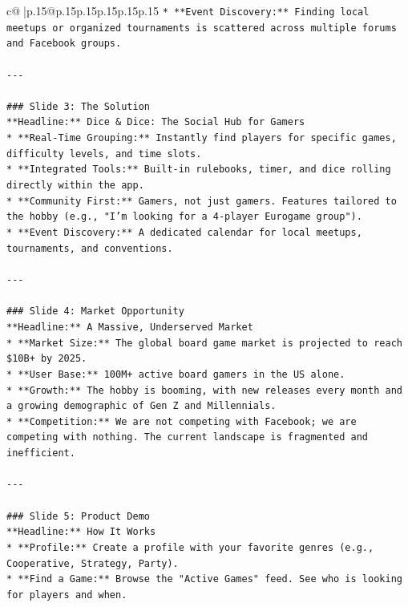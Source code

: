 \documentclass{article}
\begin{document}
{\begin{supertabular}{c@{$\;$}|p{.15\linewidth}@{}p{.15\linewidth}p{.15\linewidth}p{.15\linewidth}p{.15\linewidth}p{.15\linewidth}}
{{{\texttt{*   **Event Discovery:** Finding local meetups or organized tournaments is scattered across multiple forums and Facebook groups.} \\
\\ 
\texttt{{-}{-}{-}} \\
\\ 
\texttt{\#\#\# Slide 3: The Solution} \\
\texttt{**Headline:** Dice \& Dice: The Social Hub for Gamers} \\
\texttt{*   **Real{-}Time Grouping:** Instantly find players for specific games, difficulty levels, and time slots.} \\
\texttt{*   **Integrated Tools:** Built{-}in rulebooks, timer, and dice rolling directly within the app.} \\
\texttt{*   **Community First:** Gamers, not just gamers. Features tailored to the hobby (e.g., "I'm looking for a 4{-}player Eurogame group").} \\
\texttt{*   **Event Discovery:** A dedicated calendar for local meetups, tournaments, and conventions.} \\
\\ 
\texttt{{-}{-}{-}} \\
\\ 
\texttt{\#\#\# Slide 4: Market Opportunity} \\
\texttt{**Headline:** A Massive, Underserved Market} \\
\texttt{*   **Market Size:** The global board game market is projected to reach \$10B+ by 2025.} \\
\texttt{*   **User Base:** 100M+ active board gamers in the US alone.} \\
\texttt{*   **Growth:** The hobby is booming, with new releases every month and a growing demographic of Gen Z and Millennials.} \\
\texttt{*   **Competition:** We are not competing with Facebook; we are competing with nothing. The current landscape is fragmented and inefficient.} \\
\\ 
\texttt{{-}{-}{-}} \\
\\ 
\texttt{\#\#\# Slide 5: Product Demo} \\
\texttt{**Headline:** How It Works} \\
\texttt{*   **Profile:** Create a profile with your favorite genres (e.g., Cooperative, Strategy, Party).} \\
\texttt{*   **Find a Game:** Browse the "Active Games" feed. See who is looking for players and when.} \\
}}}
\end{supertabular}}
\end{document}
